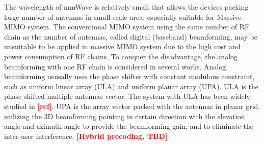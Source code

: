 \documentclass[12pt, draftcls, onecolumn]{IEEEtran}
\theoremstyle{plain}
\theoremstyle{definition}
\theoremstyle{remark}
\newcommand{\nt}[1]{\textcolor{red}{\textbf{[#1]}}}
\begin{document}
The wavelength of mmWave is relatively small that allows the devices packing large number of antennas in small-scale area, especially suitable for Massive MIMO system.
The conventional MIMO system using the same number of RF chain as the number of antennas, called digital (baseband) beamforming, may be unsuitable to be applied in massive MIMO system due to the high cost and power consumption of RF chains.
To conquer the disadvantage, the analog beamforming with one RF chain is considered in several works\cite{6600706,6979962}.
Analog beamforming ususally uses the phase shifter with constant modulous constraint, such as uniform linear array (ULA) and uniform planar array (UPA).
ULA is the phase shifted multiple antennas vector.
The system with ULA has been widely studied in \nt{ref}.
UPA \cite{6525612,7947209} is the array vector packed with the antennas in planar grid, utilizing the 3D beamforming pointing in certain direction with the elevation angle and azimuth angle to provide the beamforming gain, and to eliminate the inter-user interference.
\nt{Hybrid precoding, TBD}

\end{document}
